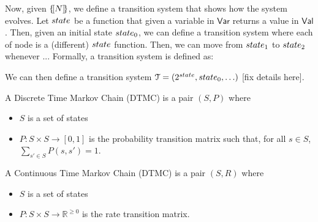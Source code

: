 Now, given $\{\![N]\!\}$, we define a transition system that shows how the
system evolves.  Let $\state$ be a function that given a variable in
$\mathsf{Var}$ returns a value in $\mathsf{Val}$. Then, given an
initial state $\state_0$, we can define a transition system where each
of node is a (different) $\state$ function. Then, we can move from
$\state_1$ to $\state_2$ whenever ... Formally, a transition system is
defined as:
\begin{definition}
\end{definition}
We can then define a transition system
$\mathcal T = (2^\state,\state_0,\ldots)$ [fix details here].

\begin{definition}
  A Discrete Time Markov Chain (DTMC) is a pair $(S,P)$ where
  \begin{itemize}
  \item $S$ is a set of states
  \item $P: S\times S \rightarrow [0,1]$ is the probability transition
    matrix such that, for all $s\in S$, $\sum_{s'\in S}P(s,s')=1$.
  \end{itemize}
\end{definition}

\begin{definition}
  A Continuous Time Markov Chain (DTMC) is a pair $(S,R)$ where
  \begin{itemize}
  \item $S$ is a set of states
  \item $P: S\times S \rightarrow \mathbb R^{\geq 0}$ is the rate
    transition matrix.
  \end{itemize}
\end{definition}



